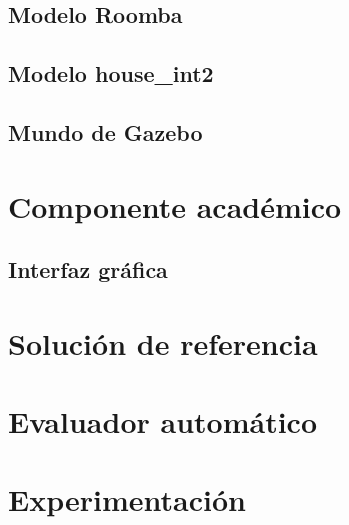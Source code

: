 \subsection{Modelo Roomba}
\subsection{Modelo house\_int2}
\subsection{Mundo de Gazebo}

\section{Componente académico}
\subsection{Interfaz gráfica}

\section{Solución de referencia} 

\section{Evaluador automático} 

\section{Experimentación} 

